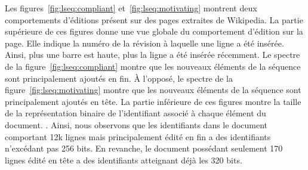 Les figures~\ref{fig:lseq:compliant} et~\ref{fig:lseq:motivating} montrent deux
comportements d'éditions présent sur des pages extraites de Wikipedia. La partie
supérieure de ces figures donne une vue globale du comportement d'édition sur la
page. Elle indique la numéro de la révision à laquelle une ligne a été
insérée. Ainsi, plus une barre est haute, plus la ligne a été insérée
récemment. Le spectre de la figure~\ref{fig:lseq:compliant} montre que les
nouveaux éléments de la séquence sont principalement ajoutés en fin. À l'opposé,
le spectre de la figure~\ref{fig:lseq:motivating} montre que les nouveaux
éléments de la séquence sont principalement ajoutés en tête. La partie
inférieure de ces figures montre la taille de la représentation binaire de
l'identifiant associé à chaque élément du document. . Ainsi, nous observons que les identifiants dans le document
comportant 12k lignes mais principalement édité en fin a des identifiants
n'excédant pas 256 bits. En revanche, le document possédant seulement 170 lignes
édité en tête a des identifiants atteignant déjà les 320 bits.


